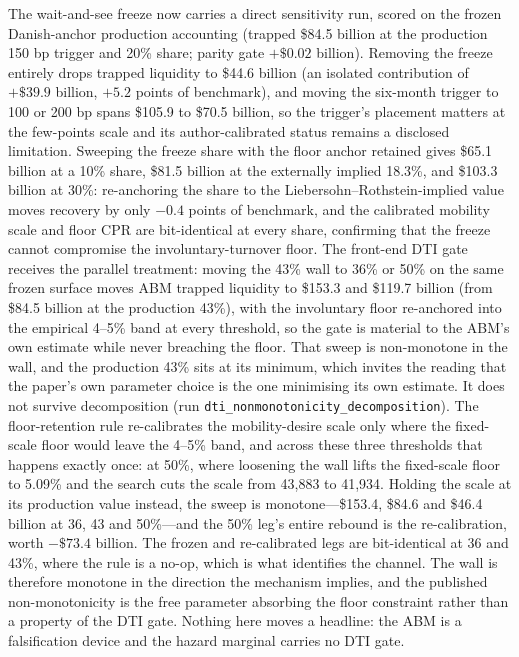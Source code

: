 \documentclass[12pt]{article}
\begin{document}
The wait-and-see freeze now carries a direct sensitivity run, scored on the frozen Danish-anchor production accounting (trapped \$84.5 billion at the production 150 bp trigger and 20\% share; parity gate $+\$0.02$ billion). Removing the freeze entirely drops trapped liquidity to \$44.6 billion (an isolated contribution of $+\$39.9$ billion, $+5.2$ points of benchmark), and moving the six-month trigger to 100 or 200 bp spans \$105.9 to \$70.5 billion, so the trigger's placement matters at the few-points scale and its author-calibrated status remains a disclosed limitation. Sweeping the freeze share with the floor anchor retained gives \$65.1 billion at a 10\% share, \$81.5 billion at the externally implied 18.3\%, and \$103.3 billion at 30\%: re-anchoring the share to the Liebersohn--Rothstein-implied value moves recovery by only $-0.4$ points of benchmark, and the calibrated mobility scale and floor CPR are bit-identical at every share, confirming that the freeze cannot compromise the involuntary-turnover floor. The front-end DTI gate receives the parallel treatment: moving the 43\% wall to 36\% or 50\% on the same frozen surface moves ABM trapped liquidity to \$153.3 and \$119.7 billion (from \$84.5 billion at the production 43\%), with the involuntary floor re-anchored into the empirical 4--5\% band at every threshold, so the gate is material to the ABM's own estimate while never breaching the floor. That sweep is non-monotone in the wall, and the production 43\% sits at its minimum, which invites the reading that the paper's own parameter choice is the one minimising its own estimate. It does not survive decomposition (run \texttt{dti\_nonmonotonicity\_decomposition}). The floor-retention rule re-calibrates the mobility-desire scale only where the fixed-scale floor would leave the 4--5\% band, and across these three thresholds that happens exactly once: at 50\%, where loosening the wall lifts the fixed-scale floor to 5.09\% and the search cuts the scale from 43{,}883 to 41{,}934. Holding the scale at its production value instead, the sweep is monotone---\$153.4, \$84.6 and \$46.4 billion at 36, 43 and 50\%---and the 50\% leg's entire rebound is the re-calibration, worth $-\$73.4$ billion. The frozen and re-calibrated legs are bit-identical at 36 and 43\%, where the rule is a no-op, which is what identifies the channel. The wall is therefore monotone in the direction the mechanism implies, and the published non-monotonicity is the free parameter absorbing the floor constraint rather than a property of the DTI gate. Nothing here moves a headline: the ABM is a falsification device and the hazard marginal carries no DTI gate.
\end{document}
